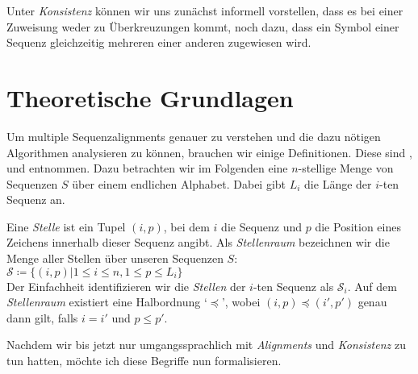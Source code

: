 Unter \emph{Konsistenz} können wir uns zunächst informell vorstellen, dass es bei einer Zuweisung weder zu Überkreuzungen kommt, noch dazu, dass ein Symbol einer Sequenz gleichzeitig mehreren einer anderen zugewiesen wird.

\section{Theoretische Grundlagen}

Um multiple Sequenzalignments genauer zu verstehen und die dazu nötigen Algorithmen analysieren zu können, brauchen wir einige Definitionen. Diese sind \citet{mdw96}, \citet{am00} und \citet{cpm10} entnommen. Dazu betrachten wir im Folgenden eine $n$-stellige Menge von Sequenzen $S$ über einem endlichen Alphabet. Dabei gibt $L_i$ die Länge der $i$-ten Sequenz an.

\begin{definition}
	Eine \emph{Stelle} ist ein Tupel $(i,p)$, bei dem $i$ die Sequenz und $p$ die Position eines Zeichens innerhalb dieser Sequenz angibt. Als \emph{Stellenraum} bezeichnen wir die Menge aller Stellen über unseren Sequenzen $S$: $\mathcal{S} \coloneqq \{(i,p)|1 \leq i \leq n, 1 \leq p \leq L_i \}$ \\
	Der Einfachheit identifizieren wir die \emph{Stellen} der $i$-ten Sequenz als $\mathcal{S}_i$. Auf dem \emph{Stellenraum} existiert eine Halbordnung `$\preceq$', wobei $(i,p) \preceq (i',p')$ genau dann gilt, falls $i=i'$ und $p\leq p'$.
\end{definition}

Nachdem wir bis jetzt nur umgangssprachlich mit \emph{Alignments} und \emph{Konsistenz} zu tun hatten, möchte ich diese Begriffe nun formalisieren.

